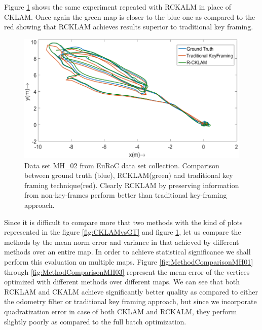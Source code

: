 Figure \ref{fig:RCKLAMvsGT} shows the same experiment repeated with RCKALM in place of CKLAM. Once again the green map is closer to the blue one as compared to the red showing that RCKLAM achieves results superior to traditional key framing. 

\begin{figure}
	\centering
		\includegraphics[width=1.00\textwidth]{images/RCKLAMvsGT.png}
  \caption{Data set MH\_02 from EuRoC \cite{Burri25012016} data set collection. Comparison between ground truth (blue), RCKLAM(green) and traditional key framing technique(red). Clearly RCKLAM by preserving information from non-key-frames perform better than traditional key-framing approach.}
  \label{fig:RCKLAMvsGT}
\end{figure}


Since it is difficult to compare more that two methods with the kind of plots represented in the figure \ref{fig:CKLAMvsGT} and figure \ref{fig:RCKLAMvsGT}, let us compare the methods by the mean norm error and variance in that achieved by different methods over an entire map. In order to achieve statistical significance we shall perform this evaluation on multiple maps. Figure \ref{fig:MethodComparisonMH01} through \ref{fig:MethodComparisonMH03} represent the mean error of the vertices optimized with different methods over different maps. We can see that both RCKLAM and CKALM achieve significantly better quality as compared to either the odometry filter or traditional key framing approach, but since we incorporate quadratization error in case of both CKLAM and RCKALM, they perform slightly poorly as compared to the full batch optimization.  

